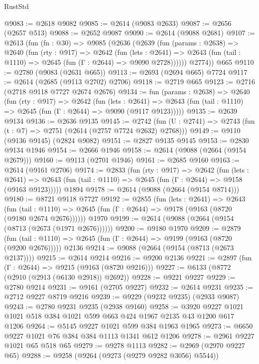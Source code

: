 \begin{lexlean}{RustStd}
\begin{coremodule}
@9083 := @2618 @9082
@9085 := @2614 (@9083 @2633)
@9087 := @2656 (@2657 @513)
@9088 := @2652 @9087
@9090 := @2614 (@9088 @2681)
@9107 := @2613
    (fun (fn : @30) =>
    @9085
      (@2636
        (@2639
          (fun (params : @2638) =>
          @2640
            (fun (rty : @917) =>
            @2642
              (fun (lets : @2641) =>
              @2643 (fun (tail : @1110) => @2645 (fun (Γ : @2644) => @9090 @2728))))))
        @2774))
    @665
@9110 := @2780 (@9083 (@2631 @665))
@9113 := @2693 (@2694 @665) @7724
@9117 := @2614 (@2685 (@9113 @2702) @2706)
@9118 := @2719 @665
@9123 := @2716 (@2718 @9118 @7727 @2674 @2676)
@9134 := fun (params : @2638) =>
  @2640
    (fun (rty : @917) =>
    @2642
      (fun (lets : @2641) =>
      @2643 (fun (tail : @1110) => @2645 (fun (Γ : @2644) => @9090 (@9117 @9123)))))
@9135 := @2639 @9134
@9136 := @2636 @9135
@9145 := @2742 (fun (U : @2741) => @2743 (fun (t : @7) => @2751 (@2614 (@2757 @7724 @2632) @2768)))
@9149 := @9110 (@9136 @9145) (@2824 @9082)
@9151 := @2827 @9135 @9145
@9153 := @2830 @9134 @1946
@9154 := @2666 @1946
@9158 := @2614 (@9088 (@2664 (@9154 @2679)))
@9160 := @9113 (@2701 @1946)
@9161 := @2685 @9160
@9163 := @2614 (@9161 @2706)
@9174 := @2833
    (fun (rty : @917) =>
    @2642
      (fun (lets : @2641) =>
      @2643 (fun (tail : @1110) => @2645 (fun (Γ : @2644) => @9158 (@9163 @9123)))))
    @1894
@9178 := @2614 (@9088 (@2664 (@9154 @8714)))
@9180 := @8721 @9118 @7727
@9192 := @2855
    (fun (lets : @2641) =>
    @2643
      (fun (tail : @1110) => @2645 (fun (Γ : @2644) => @9178 (@9163 (@8720 (@9180 @2674 @2676))))))
    @1970
@9199 := @2614 (@9088 (@2664 (@9154 (@8713 (@2673 (@1971 @2676))))))
@9200 := @9180 @1970
@9209 := @2879
    (fun (tail : @1110) => @2645 (fun (Γ : @2644) => @9199 (@9163 (@8720 (@9200 @2676)))))
    @2136
@9214 := @9088 (@2664 (@9154 (@8713 (@2673 @2137))))
@9215 := @2614 @9214
@9216 := @9200 @2136
@9221 := @2897 (fun (Γ : @2644) => @9215 (@9163 (@8720 @9216)))
@9227 := @6133 (@8772 (@2910 (@2913 (@6130 @2918)) @2692))
@9228 := @9221 @9227
@9229 := @2780 @9214
@9231 := @9161 (@2705 @9227)
@9232 := @2614 @9231
@9235 := @2712 @9227 @8719 @9216
@9239 := @9229 (@9232 @9235) (@2933 @9087)
@9243 := @2780 @9231 @9235 (@2938 @9160)
@9258 := @3920 @9227 @1021 @1021 @518 @384 @1021 @599 @663 @424 @1967 @2135 @43 @1200 @617 @1206
@9264 := @5145 @9227 @1021 @599 @384 @1963 @1965
@9273 := @6650 @9227 @1021 @76 @384 @384 @1113 @1341 @612 @1206
@9278 := @2961 @9227 @1021 @65 @518 @65
@9279 := @9278 @1113
@9282 := @2969 (@2970 @9227 @65)
@9288 := @9258 (@9264 (@9273 (@9279 @9282 @3056) @5544))

\end{coremodule}
\end{lexlean}
